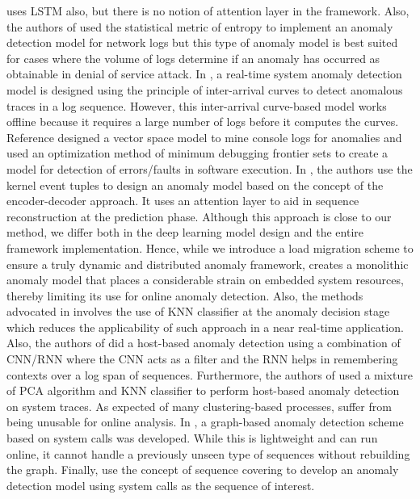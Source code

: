 uses LSTM also, 
but there is no notion of attention layer in the framework. 
Also, the authors 
of \cite{gu2005detecting} used the statistical metric of 
entropy to implement 
an anomaly detection model for network logs but this type of 
anomaly model is 
best suited for cases where the volume of logs determine if 
an anomaly has 
occurred as obtainable in denial of service attack. In 
\cite{salem2016anomaly}, a real-time system anomaly 
detection model is 
designed using the principle of inter-arrival curves to 
detect anomalous traces 
in a log sequence. However, this inter-arrival curve-based 
model works offline 
because it requires a large number of logs before it computes 
the curves. 
Reference \cite{xu2009largescale} designed a vector space 
model to mine console 
logs for anomalies and \cite{li2017locating} used an 
optimization method of 
minimum debugging frontier sets to create a model for 
detection of 
errors/faults in software execution. In 
\cite{Ezeme2018RTCSA,ezeme2019dream}, the authors use 
the kernel event tuples to design an anomaly model based on 
the concept of the 
encoder-decoder approach. It uses an attention layer to aid 
in sequence 
reconstruction at the prediction phase. Although this 
approach is close to our 
method, we differ both in the deep learning model design and 
the entire framework implementation. 
Hence, while we introduce a load migration scheme to ensure a 
truly dynamic and 
distributed anomaly framework, \cite{Ezeme2018RTCSA} creates 
a 
monolithic anomaly 
model that places a considerable strain on embedded system 
resources, thereby 
limiting its use for online anomaly detection. Also, the 
methods 
advocated in \cite{Ezeme2018RTCSA,ezeme2019dream} 
involves the use of KNN classifier at the anomaly decision 
stage which reduces the applicability of such approach in a 
near real-time application. Also, the authors of 
\cite{chawla2018host} did a host-based anomaly detection 
using a combination of CNN/RNN where the CNN acts as a filter 
and the RNN helps in remembering contexts over a log span of 
sequences. Furthermore, the authors of \cite{serpen2018host} 
used a mixture of PCA algorithm and KNN classifier to perform 
host-based anomaly detection on system traces. As expected of 
many clustering-based processes, 
\cite{serpen2018host,Ezeme2017} suffer from being unusable for online analysis. In \cite{al2019anomaly}, a 
graph-based anomaly detection scheme based on system calls 
was developed. While this is lightweight and can run online, 
it cannot handle a previously unseen type of sequences 
without rebuilding the graph. Finally, 
\cite{marteau2018sequence} use the concept of sequence 
covering to develop an anomaly detection model using system 
calls as the sequence of interest.


